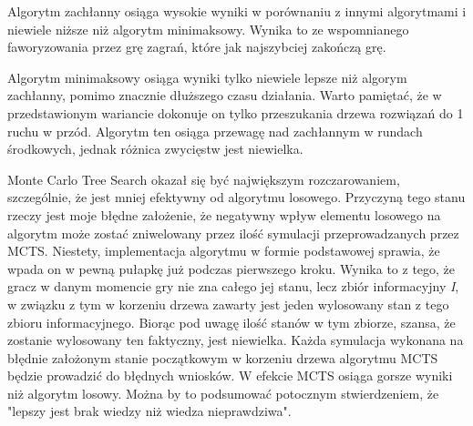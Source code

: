 Algorytm zachłanny osiąga wysokie wyniki w porównaniu z innymi algorytmami i niewiele niższe niż algorytm minimaksowy. Wynika to ze wspomnianego faworyzowania przez grę zagrań, które jak najszybciej zakończą grę. 

Algorytm minimaksowy osiąga wyniki tylko niewiele lepsze niż algorym zachłanny, pomimo znacznie dłuższego czasu działania. Warto pamiętać, że w przedstawionym wariancie dokonuje on tylko przeszukania drzewa rozwiązań do 1 ruchu w przód. Algorytm ten osiąga przewagę nad zachłannym w rundach środkowych, jednak różnica zwycięstw jest niewielka.

Monte Carlo Tree Search okazał się być największym rozczarowaniem, szczególnie, że jest mniej efektywny od algorytmu losowego. Przyczyną tego stanu rzeczy jest moje błędne założenie, że negatywny wpływ elementu losowego na algorytm może zostać zniwelowany przez ilość symulacji przeprowadzanych przez MCTS. Niestety, implementacja algorytmu w formie podstawowej sprawia, że wpada on w pewną pułapkę już podczas pierwszego kroku. Wynika to z tego, że gracz w danym momencie gry nie zna całego jej stanu, lecz zbiór informacyjny \textit{I}, w związku z tym w korzeniu drzewa zawarty jest jeden wylosowany stan z tego zbioru informacyjnego. Biorąc pod uwagę ilość stanów w tym zbiorze, szansa, że zostanie wylosowany ten faktyczny, jest niewielka. Każda symulacja wykonana na błędnie założonym stanie początkowym w korzeniu drzewa algorytmu MCTS będzie prowadzić do błędnych wniosków. W efekcie MCTS osiąga gorsze wyniki niż algorytm losowy. Można by to podsumować potocznym stwierdzeniem, że "lepszy jest brak wiedzy niż wiedza nieprawdziwa".